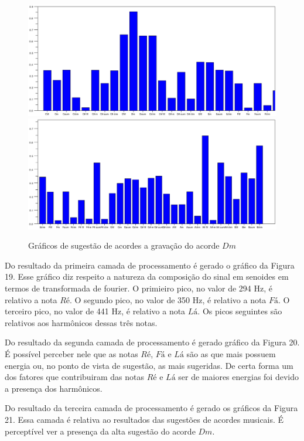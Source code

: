 \begin{figure}[h]
	\centering
		\includegraphics[keepaspectratio=true,scale=0.49]{figuras/Dm/acordes_1_Dm.eps}
		\includegraphics[keepaspectratio=true,scale=0.49]{figuras/Dm/acordes_2_Dm.eps}
	\caption{Gráficos de sugestão de acordes a gravação do acorde $Dm$}
\end{figure}
\newpage

Do resultado da primeira camada de processamento é gerado o gráfico da Figura 19. Esse gráfico diz respeito a natureza da composição do sinal em senoides em termos de transformada de fourier. O primieiro pico, no valor de 294 Hz, é relativo a nota $Ré$. O segundo pico, no valor de 350 Hz, é relativo a nota $Fá$. O terceiro pico, no valor de 441 Hz, é relativo a nota $Lá$. Os picos seguintes são relativos aos harmônicos dessas três notas. 

Do resultado da segunda camada de processamento é gerado gráfico da Figura 20. É possível perceber nele que as notas $Ré$, $Fá$ e $Lá$ são as que mais possuem energia ou, no ponto de vista de sugestão, as mais sugeridas. De certa forma um dos fatores que contribuiram das notas $Ré$ e $Lá$ ser de maiores energias foi devido a presença dos harmônicos.

Do resultado da terceira camada de processamento é gerado os gráficos da Figura 21. Essa camada é relativa ao resultados das sugestões de acordes musicais. É perceptível ver a presença da alta sugestão do acorde $Dm$.

